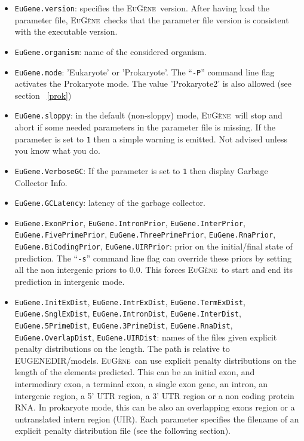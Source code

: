 \documentclass[a4paper,titlepage]{report}
\newcommand{\EuGene}{\textsc{EuG\`ene}}
\begin{document}
\begin{itemize}
\item \texttt{EuGene.version}: specifies the \EuGene \ version. 
  After having load the parameter file, \EuGene \ checks
  that the parameter file version is consistent with the executable
  version.

  \item \texttt{EuGene.organism}: name of the considered organism.

  \item \texttt{EuGene.mode}: 'Eukaryote' or 'Prokaryote'. The ``\texttt{-P}'' command 
  line flag activates the Prokaryote mode.  The value 'Prokaryote2' is also allowed (see section ~\ref{prok})
   
  \item \texttt{EuGene.sloppy}: in the default (non-sloppy) mode, 
  \EuGene\ will stop and abort if some needed parameters in the parameter
  file is missing. If the parameter is set to \texttt{1} then a simple warning
  is emitted. Not advised unless you know what you do.

  \item \texttt{EuGene.VerboseGC}: If the parameter is set to \texttt{1} then 
  display Garbage Collector Info.

  \item \texttt{EuGene.GCLatency}: latency of the garbage collector.

  \item \texttt{EuGene.ExonPrior}, \texttt{EuGene.IntronPrior},
  \texttt{EuGene.InterPrior}, \texttt{EuGene.FivePri\-mePrior},
  \texttt{EuGene.ThreePrimePrior}, \texttt{EuGene.RnaPrior}, 
  \texttt{EuGene.BiCodingPrior}, \texttt{EuGene.UIRPrior}: 
  prior on the initial/final state of
  prediction. The ``\texttt{-s}'' command line flag can override these
  priors by setting all the non intergenic priors to $0.0$. This
  forces \EuGene\ to start and end its prediction in intergenic mode.
  
\item \texttt{EuGene.InitExDist}, \texttt{EuGene.IntrExDist},
  \texttt{EuGene.TermExDist}, \texttt{EuGene.SnglExDist},
  \texttt{EuGene.IntronDist}, \texttt{EuGene.InterDist},
  \texttt{EuGene.5PrimeDist}, \texttt{EuGene.3PrimeDist}, 
  \texttt{EuGene.RnaDist}, \texttt{EuGene.OverlapDist}, \texttt{EuGene.UIRDist}: 
  names of the files given explicit penalty distributions on the length. 
  The path is relative to EUGENEDIR/models. \EuGene\ 
  can use explicit penalty distributions on the length of the elements
  predicted. This can be an initial exon, and intermediary exon, a
  terminal exon, a single exon gene, an intron, an intergenic region, a
  5' UTR region, a 3' UTR region or a non coding protein RNA. 
  In prokaryote mode, this can be also an overlapping exons
  region or a untranslated intern region (UIR). 
  Each parameter specifies the
  filename of an explicit penalty distribution file (see the following section). %


\end{itemize}
\end{document}
